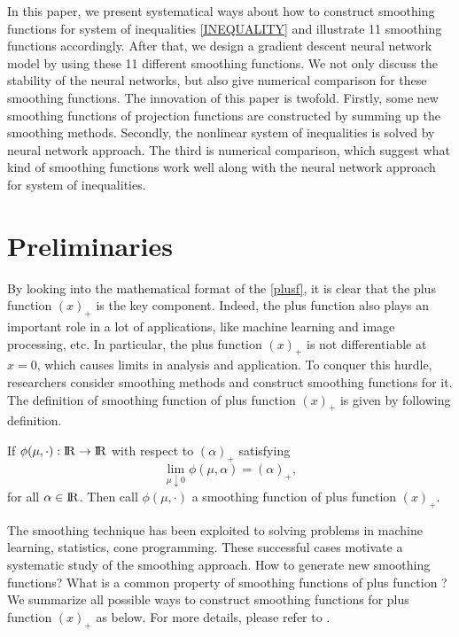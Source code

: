 \documentclass[12pt]{article}
\renewcommand{\Re}{{\rm I}\! {\rm R}}
\begin{document}
 In this paper, we present systematical
 ways about how to construct smoothing functions for system of inequalities \eqref{INEQUALITY}
 and illustrate 11 smoothing functions accordingly. After that, we design a gradient descent
 neural network model by using these 11 different smoothing functions. We not
 only discuss the stability of the neural networks, but also give numerical comparison
 for these smoothing functions.  The innovation of this paper is twofold.
 Firstly, some new smoothing functions of projection functions are constructed by summing up
 the smoothing methods. Secondly, the nonlinear system of inequalities is solved by neural network
 approach. The third is  numerical comparison, which suggest what kind of smoothing functions work well
 along with the neural network approach for system of  inequalities.
 \\




 \section{Preliminaries} \label{sec2}



 By looking into the mathematical format of the \eqref{plusf}, it is clear that the plus
  function $(x)_+$ is the key component. Indeed, the plus function
 also plays an important role in a lot of applications, like machine learning and
 image processing, etc. In particular, the plus
  function $(x)_+$ is not
 differentiable at $x=0$, which causes limits in analysis and application. To conquer
 this hurdle, researchers consider smoothing methods and construct smoothing functions
 for it.
 The definition of smoothing function of plus function $(x)_+$ is given by following definition.
 \begin{definition}
 If  $\phi(\mu, \cdot):\Re \to \Re$ with respect to
 $(\alpha)_+$ satisfying
 \begin{equation*} \label{condition}
 \lim_{\mu \downarrow 0} \phi(\mu,\alpha) =(\alpha)_{+},
 \end{equation*}
 for all $\alpha\in \Re$. Then call $\phi(\mu, \cdot)$ a smoothing function of plus function $ (x)_+$.
 \end{definition}

 The smoothing technique has been exploited to solving problems in
  machine learning, statistics, cone programming. These successful cases motivate a systematic
  study of the smoothing approach. How to generate new smoothing functions?
  What is a common property of smoothing functions of plus function ?
  We summarize all possible ways to construct smoothing functions for plus
  function $(x)_+$
 as below. For more details, please refer to \cite{BM12, CM96, KR92, Nesterov05, QD02, VOY15}.
 \\
\end{document}
